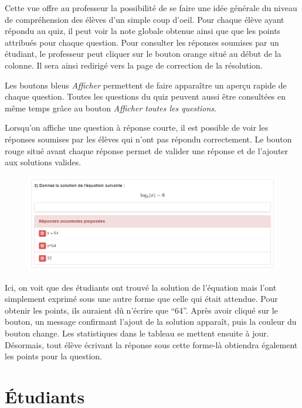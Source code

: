 \documentclass[a4,10pt,french]{sphinxmanual}
\begin{document}
Cette vue offre au professeur la possibilité de se faire une idée générale du niveau de compréhension des élèves d'un simple coup d'oeil. Pour chaque élève ayant répondu au quiz, il peut voir la note globale obtenue ainsi que que les points attribués pour chaque question. Pour consulter les réponses soumises par un étudiant, le professeur peut cliquer sur le bouton orange situé au début de la colonne. Il sera ainsi redirigé vers la page de correction de la résolution.

Les boutons bleus \emph{Afficher} permettent de faire apparaître un aperçu rapide de chaque question. Toutes les questions du quiz peuvent aussi être consultées en même temps grâce au bouton \emph{Afficher toutes les questions}.

Lorsqu'on affiche une question à réponse courte, il est possible de voir les réponses soumises par les élèves qui n'ont pas répondu correctement. Le bouton rouge situé avant chaque réponse permet de valider une réponse et de l'ajouter aux solutions valides.
\begin{figure}[htbp]
\centering

\includegraphics{add-solution.png}
\end{figure}

Ici, on voit que des étudiants ont trouvé la solution de l'équation mais l'ont simplement exprimé sous une autre forme que celle qui était attendue. Pour obtenir les points, ils auraient dû n'écrire que ``64''. Après avoir cliqué sur le bouton, un message confirmant l'ajout de la solution apparaît, puis la couleur du bouton change. Les statistiques dans le tableau se mettent ensuite à jour. Désormais, tout élève écrivant la réponse sous cette forme-là obtiendra également les points pour la question.


\section{Étudiants}
\label{doc-user:etudiants}
\end{document}
